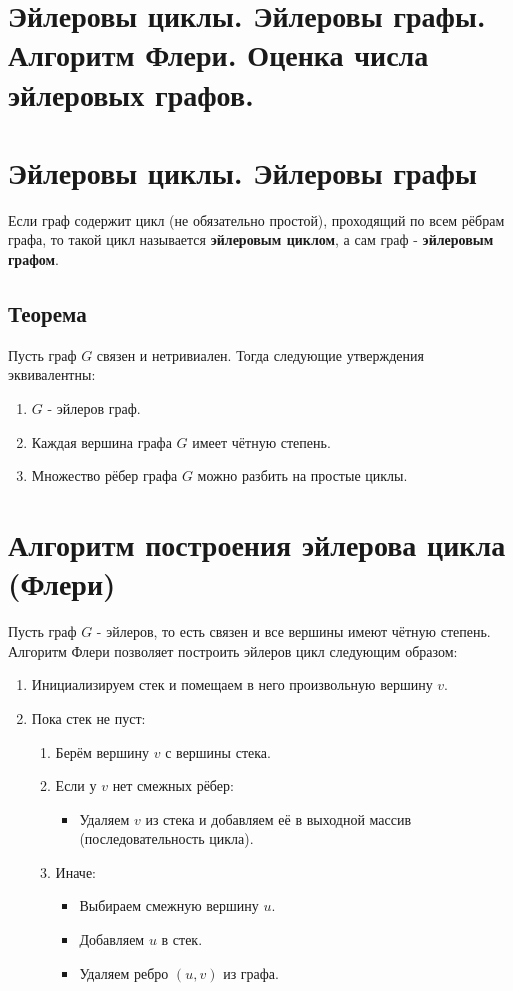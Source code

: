 {
	\section{Эйлеровы циклы. Эйлеровы графы. Алгоритм Флери. Оценка числа эйлеровых
графов.}

\section*{Эйлеровы циклы. Эйлеровы графы}

Если граф содержит цикл (не обязательно простой), проходящий по всем рёбрам графа, то такой цикл называется \textbf{эйлеровым циклом}, а сам граф - \textbf{эйлеровым графом}.

\subsection*{Теорема}

Пусть граф $G$ связен и нетривиален. Тогда следующие утверждения эквивалентны:

\begin{enumerate}
  \item $G$ - эйлеров граф.
  \item Каждая вершина графа $G$ имеет чётную степень.
  \item Множество рёбер графа $G$ можно разбить на простые циклы.
\end{enumerate}

\section*{Алгоритм построения эйлерова цикла (Флери)}

Пусть граф $G$ - эйлеров, то есть связен и все вершины имеют чётную степень.  
Алгоритм Флери позволяет построить эйлеров цикл следующим образом:

\begin{enumerate}
  \item Инициализируем стек и помещаем в него произвольную вершину $v$.
  \item Пока стек не пуст:
  \begin{enumerate}
    \item Берём вершину $v$ с вершины стека.
    \item Если у $v$ нет смежных рёбер:
    \begin{itemize}
      \item Удаляем $v$ из стека и добавляем её в выходной массив (последовательность цикла).
    \end{itemize}
    \item Иначе:
    \begin{itemize}
      \item Выбираем смежную вершину $u$.
      \item Добавляем $u$ в стек.
      \item Удаляем ребро $(u, v)$ из графа.
    \end{itemize}
  \end{enumerate}
\end{enumerate}

}
